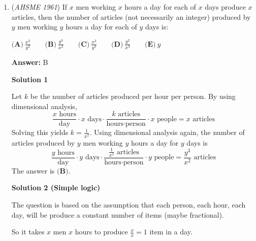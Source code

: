 \begin{enumerate}
 



\textbf{Solution 2}

<i>By Ajeet Dubey | \href{https://ioqm.in}{ioqm.in}</i>

 Let the diagonals of the rhombus be $d$ and $2d$. Its area is$K=\frac12(d)(2d)=d^2.$The diagonals bisect each other at right angles, so a side of the rhombus is the hypotenuse of a right triangle with legs $d/2$ and $d$. Thus$s=\sqrt{\left(\frac d2\right)^2+d^2}=\frac{d\sqrt5}{2}=\frac{\sqrt{5K}}{2}.$This is not among choices (A) through (D).

 Thus the answer is $\boxed{\textbf{(E)}}$.

 


	\item (\textit{AHSME 1961}) If $x$ men working $x$ hours a day for each of $x$ days produce $x$ articles, then the number of articles 
(not necessarily an integer) produced by $y$ men working $y$ hours a day for each of $y$ days is:


 $\textbf{(A)}\ \frac{x^3}{y^2}\qquad \textbf{(B)}\ \frac{y^3}{x^2}\qquad \textbf{(C)}\ \frac{x^2}{y^3}\qquad \textbf{(D)}\ \frac{y^2}{x^3}\qquad \textbf{(E)}\ y$

 \textbf{Answer: }B



\textbf{Solution 1}

Let $k$ be the number of articles produced per hour per person.  By using dimensional analysis,
 \[\frac{x \text{ hours}}{\text{day}} \cdot x \text{ days} \cdot \frac{k \text{ articles}}{\text{hours} \cdot \text{person}} \cdot x \text{ people} = x \text{ articles}\]Solving this yields $k = \frac{1}{x^2}$.  Using dimensional analysis again, the number of articles produced by $y$ men working $y$ hours a day for $y$ days is
 \[\frac{y \text{ hours}}{\text{day}} \cdot y \text{ days} \cdot \frac{\frac{1}{x^2} \text{ articles}}{\text{hours} \cdot \text{person}} \cdot y \text{ people} = \frac{y^3}{x^2} \text{ articles}\]The answer is $\boxed{\textbf{(B)}}$.

 



\textbf{Solution 2 (Simple logic)}

The question is based on the assumption that each person, each hour, each day, will be produce a constant number of items (maybe fractional).

 So it takes $x$ men $x$ hours to produce $\frac{x}{x}=1$ item in a day.


\end{enumerate}
